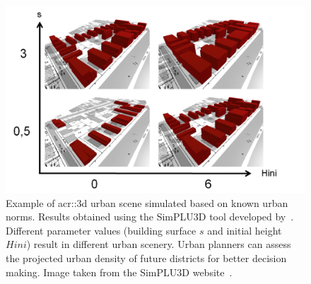             \begin{figure}[htb]
                \centering
                \includegraphics[width=\textwidth]{images/introduction/3d_model_applications/simplu}
                \caption[
                    Example of \acrshort*{acr::3d} urban scene simulated based on known urban norms.
                ]{
                    \label{fig::3d_simulation}
                    Example of \gls{acr::3d} urban scene simulated based on known urban norms.
                    Results obtained using the SimPLU3D tool developed by~\textcite{brasebin2017stochastic}.
                    Different parameter values (building surface \(s\) and initial height \(Hini\)) result in different urban scenery.
                    Urban planners can assess the projected urban density of future districts for better decision making.
                    Image taken from the SimPLU3D website~\parencite{brasebin2014simplu3d}.
                }
            \end{figure}
